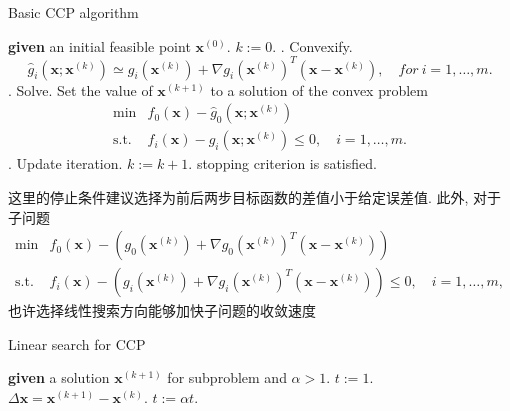\documentclass{article}
\begin{document}
\begin{algorithm}[H]
\caption{Basic CCP algorithm}
\begin{algorithmic}
\STATE \textbf{given} an initial feasible point $\bm{x}^{(0)}$.
\STATE $k:=0$.
\REPEAT
{}. Convexify. 
\begin{displaymath}
\hat{g}_i(\bm{x};\bm{x}^{(k)}) \simeq g_i(\bm{x}^{(k)}) + \nabla g_i(\bm{x}^{(k)})^T(\bm{x}-\bm{x}^{(k)}), \quad for~i = 1,\dots,m.
\end{displaymath}
. Solve. Set the value of $\bm{x}^{(k+1)}$ to a solution of the convex problem
\begin{equation}
\begin{array}{cl}
{\min} & {f_0(\bm{x})-\hat{g}_0(\bm{x};\bm{x}^{(k)})} \\
{\text{s.t.}} & {f_i(\bm{x})-\hat{g}_i(\bm{x};\bm{x}^{(k)}) \leq 0,\quad i=1,\dots,m.}
\end{array}
\end{equation} 
. Update iteration. $k:=k+1$.
\UNTIL stopping criterion is satisfied.
\end{algorithmic}
\end{algorithm}

这里的停止条件建议选择为前后两步目标函数的差值小于给定误差值.
此外, 对于子问题
\begin{equation}
\begin{array}{cl}
{\min} & {f_0(\bm{x}) - \left(g_0(\bm{x}^{(k)}) + \nabla g_0(\bm{x}^{(k)})^T(\bm{x}-\bm{x}^{(k)}) \right)} \\
{\text{s.t.}} &  {f_i(\bm{x}) - \left(g_i(\bm{x}^{(k)}) + \nabla g_i(\bm{x}^{(k)})^T(\bm{x}-\bm{x}^{(k)}) \right) \leq 0,\quad i=1,\dots,m,}
\end{array}
\end{equation}
也许选择线性搜索方向能够加快子问题的收敛速度
\begin{algorithm}[H]
\caption{Linear search for CCP}
\begin{algorithmic}
\STATE \textbf{given} a solution $\bm{x}^{(k+1)}$ for subproblem and $\alpha>1$.
\STATE $t:=1$.
\STATE $\Delta \bm{x} = \bm{x}^{(k+1)} - \bm{x}^{(k)}$.
\STATE $t:=\alpha t$.
\ENDWHILE
\end{algorithmic}
\end{algorithm}


\end{document}
